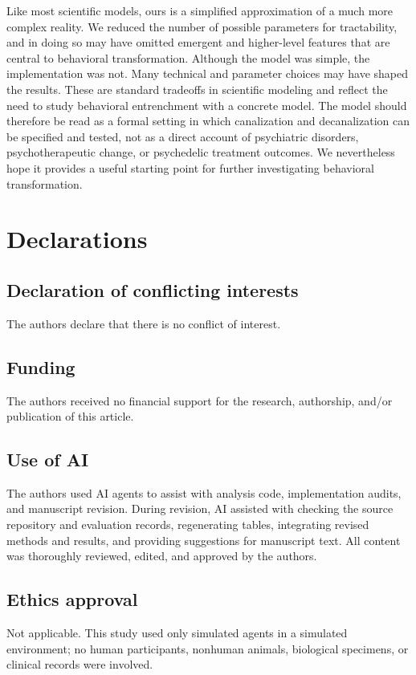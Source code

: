 \documentclass[12pt,fleqn]{article}
\begin{document}
Like most scientific models, ours is a simplified approximation of a much more complex reality. We reduced the number of possible parameters for tractability, and in doing so may have omitted emergent and higher-level features that are central to behavioral transformation. Although the model was simple, the implementation was not. Many technical and parameter choices may have shaped the results. These are standard tradeoffs in scientific modeling and reflect the need to study behavioral entrenchment with a concrete model. The model should therefore be read as a formal setting in which canalization and decanalization can be specified and tested, not as a direct account of psychiatric disorders, psychotherapeutic change, or psychedelic treatment outcomes. We nevertheless hope it provides a useful starting point for further investigating behavioral transformation.

\section*{Declarations}

\subsection*{Declaration of conflicting interests}
The authors declare that there is no conflict of interest.

\subsection*{Funding}
\begin{sloppypar}
  The authors received no financial support for the research, authorship, and/or publication of this article.
\end{sloppypar}

\subsection*{Use of AI}

The authors used AI agents to assist with analysis code, implementation audits, and manuscript revision. During revision, AI assisted with checking the source repository and evaluation records, regenerating tables, integrating revised methods and results, and providing suggestions for manuscript text. All content was thoroughly reviewed, edited, and approved by the authors.

\subsection*{Ethics approval}
Not applicable. This study used only simulated agents in a simulated environment; no human participants, nonhuman animals, biological specimens, or clinical records were involved.
\end{document}
